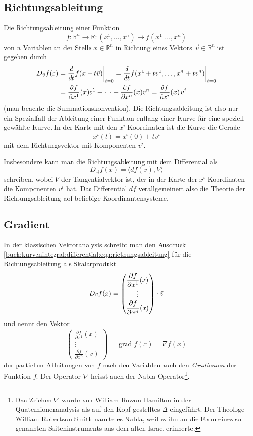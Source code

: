 \subsection{Richtungsableitung}
Die Richtungsableitung einer Funktion 
\[
f\colon
\mathbb{R}^n\to\mathbb{R}
:
(x^1,\dots,x^n)\mapsto f(x^1,\dots,x^n)
\]
von $n$ Variablen an der Stelle $x\in\mathbb{R}^n$ in Richtung
eines Vektors $\vec{v}\in\mathbb{R}^n$ ist gegeben durch
\begin{align}
D_{\vec{v}}f(x)
&=
\frac{d}{dt}
f(x+t\vec{v})
\bigg|_{t=0}
=
\frac{d}{dt}
f(x^1+tv^1,\dots,x^n+tv^n)\bigg|_{t=0}
\notag
\\
&=
\frac{\partial f}{\partial x^1}(x)v^1
+
\dots
+
\frac{\partial f}{\partial x^n}(x)v^n
=
\frac{\partial f}{\partial x^i}(x)\,v^i
\label{buch:kurvenintegral:differential:eqn:ricthungsableitung}
\end{align}
(man beachte die Summationskonvention).
Die Richtungsableitung ist also nur ein Spezialfall der Ableitung
einer Funktion entlang einer Kurve für eine speziell gewählte
Kurve.
In der Karte mit den $x^i$-Koordinaten ist die Kurve die Gerade
\[
x^i(t) = x^i(0) + tv^i
\]
mit dem Richtungsvektor mit Komponenten $v^i$.

Insbesondere kann man die Richtungsableitung mit dem Differential
als
\[
D_{\vec{v}}f(x)
=
\langle
df(x),
V
\rangle
\]
schreiben, wobei $V$ der Tangentialvektor ist, der in der Karte
der $x^i$-Koordinaten die Komponenten $v^i$ hat.
Das Differential $df$ verallgemeinert also die Theorie der 
Richtungsableitung aof beliebige Koordinantensysteme.


%
%
\subsection{Gradient}
In der klassischen Vektoranalysis schreibt man den Ausdruck
\eqref{buch:kurvenintegral:differential:eqn:ricthungsableitung}
für die Richtungsableitung als Skalarprodukt
\[
D_{\vec{v}}f(x)
=
\renewcommand{\arraystretch}{1.5}
\begin{pmatrix}
\displaystyle
\frac{\partial f}{\partial x^1}(x)\\
\vdots\\
\displaystyle
\frac{\partial f}{\partial x^n}(x)
\end{pmatrix}
\cdot
\vec{v}
\]
und nennt den Vektor
\[
\renewcommand{\arraystretch}{1.5}
\begin{pmatrix}
\displaystyle
\frac{\partial f}{\partial x^1}(x)\\
\vdots\\
\displaystyle
\frac{\partial f}{\partial x^n}(x)
\end{pmatrix}
=
\operatorname{grad}f(x)
=
\nabla f(x)
\]
der partiellen Ableitungen von $f$ nach den
Variablen auch den {\em Gradienten}
%
der Funktion $f$.
Der Operator $\nabla$ heisst auch der Nabla-Operator\footnote{Das Zeichen
$\nabla$ wurde von William Rowan Hamilton in der Quaternionenanalysis
als auf den Kopf gestelltes $\Delta$ eingeführt.
Der Theologe William Robertson Smith nannte es Nabla, weil
es ihn an die Form eines so genannten Saiteninstruments aus dem
alten Israel erinnerte.}.

